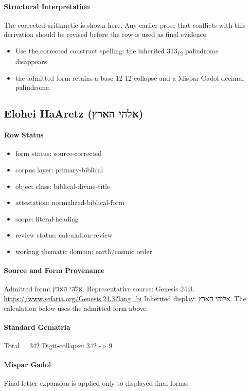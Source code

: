 \paragraph{Structural Interpretation}
The corrected arithmetic is shown here. Any earlier prose that conflicts with this derivation should be revised before the row is used as final evidence.

\begin{itemize}
\item Use the corrected construct spelling: the inherited 313\textsubscript{12} palindrome disappears
\item the admitted form retains a base-12 12-collapse and a Mispar Gadol decimal palindrome.
\end{itemize}

\subsection{Elohei HaAretz (אלהי הארץ)}
\paragraph{Row Status}
\begin{itemize}
\item form status: source-corrected
\item corpus layer: primary-biblical
\item object class: biblical-divine-title
\item attestation: normalized-biblical-form
\item scope: literal-heading
\item review status: calculation-review
\item working thematic domain: earth/cosmic order
\end{itemize}
\paragraph{Source and Form Provenance}
Admitted form: אלהי הארץ.
Representative source: Genesis 24:3.
\url{https://www.sefaria.org/Genesis.24.3?lang=bi}
Inherited display: אלוהי הארץ. The calculation below uses the admitted form above.
\paragraph{Standard Gematria}
Total = 342
Digit-collapse: 342 -> 9
\paragraph{Mispar Gadol}
Final-letter expansion is applied only to displayed final forms.

